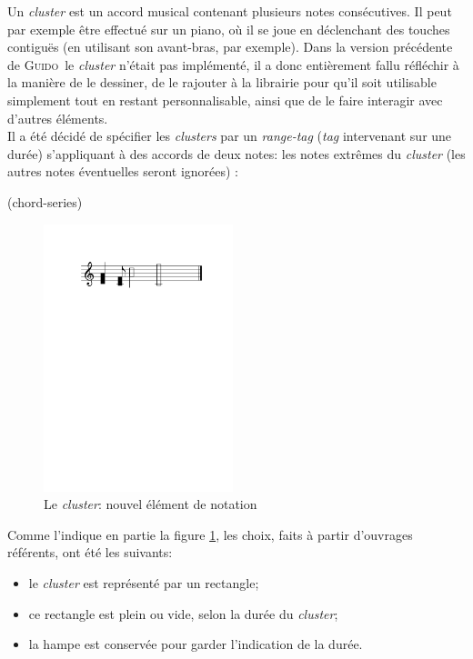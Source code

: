 \documentclass{article}
\newenvironment{gmncode}	{\vspace{-2mm}\small\verbatim}{\endverbatim\vspace{-2mm}}
\newcommand{\guido}			{\textsc{Guido}}
\begin{document}
Un \emph{cluster} est un accord musical contenant plusieurs notes consécutives. Il peut par exemple être effectué sur un piano, où il se joue en déclenchant des touches contiguës (en utilisant son avant-bras, par exemple).
%
Dans la version précédente de \guido\, le \emph{cluster} n'était pas implémenté, il a donc entièrement fallu réfléchir à la manière de le dessiner, de le rajouter à la librairie pour qu'il soit utilisable simplement tout en restant personnalisable, ainsi que de le faire interagir avec d'autres éléments.
%
\\
%
%

Il a été décidé de spécifier les \emph{clusters} par un \emph{range-tag} (\emph{tag} intervenant sur une durée) s'appliquant à des accords de deux notes: les notes extrêmes du \emph{cluster} (les autres notes éventuelles seront ignorées) :

\begin{gmncode}
(chord-series)
\end{gmncode}


%
\begin{figure}[h]
\centering
\begin{gmncode}
[
  \cluster({a, d} {c/8, f}
    {a/2, d2} {f/1, c1})
]
\end{gmncode}
\includegraphics[width=55mm]{img/partitions/cluster.pdf}
\caption{Le \emph{cluster}: nouvel élément de notation}
\label{fig:cluster}
\end{figure}
%

Comme l'indique en partie la figure \ref{fig:cluster}, les choix, faits à partir d'ouvrages référents, ont été les suivants:
\begin{itemize}
	\item le \emph{cluster} est représenté par un rectangle;
	\item ce rectangle est plein ou vide, selon la durée du \emph{cluster};
	\item la hampe est conservée pour garder l'indication de la durée.
\end{itemize}
\end{document}
